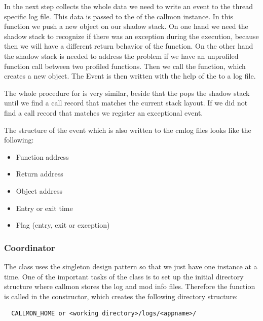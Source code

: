 In the next step  collects the whole data we need to write an event to the thread specific log file. This data is passed to the  of the callmon instance. In this function we push a new  object on our shadow stack. On one hand we need the shadow stack to recognize if there was an exception during the execution, because then we will have a different return behavior of the function. On the other hand the shadow stack is needed to address the problem if we have an unprofiled function call between two profiled functions. Then we call the  function, which creates a new  object. The Event is then written with the help of the  to a log file.

The whole procedure for  is very similar, beside that the  pops the shadow stack until we find a call record that matches the current stack layout. If we did not find a call record that matches we register an exceptional event.

The structure of the event which is also written to the cmlog files looks like the following:
\begin{itemize}
	\item Function address
	\item Return address
	\item Object address
	\item Entry or exit time
	\item Flag (entry, exit or exception)
\end{itemize}

\subsubsection{Coordinator}

The  class uses the singleton design pattern so that we just have one  instance at a time. One of the important tasks of the class is to set up the initial directory structure where callmon stores the log and mod info files. Therefore the function  is called in the constructor, which creates the following directory structure:

\begin{verbatim}
  CALLMON_HOME or <working directory>/logs/<appname>/
\end{verbatim}

